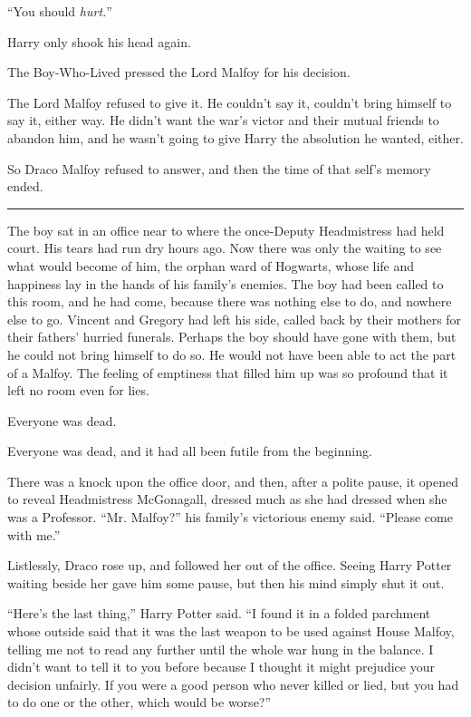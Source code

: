 ``You should \emph{hurt.}''

Harry only shook his head again.

The Boy-Who-Lived pressed the Lord Malfoy for his decision.

The Lord Malfoy refused to give it. He couldn't say it, couldn't bring himself to say it, either way. He didn't want the war's victor and their mutual friends to abandon him, and he wasn't going to give Harry the absolution he wanted, either.

So Draco Malfoy refused to answer, and then the time of that self's memory ended.

\begin{center}\rule{3in}{0.4pt}\end{center}

The boy sat in an office near to where the once-Deputy Headmistress had held court. His tears had run dry hours ago. Now there was only the waiting to see what would become of him, the orphan ward of Hogwarts, whose life and happiness lay in the hands of his family's enemies. The boy had been called to this room, and he had come, because there was nothing else to do, and nowhere else to go. Vincent and Gregory had left his side, called back by their mothers for their fathers' hurried funerals. Perhaps the boy should have gone with them, but he could not bring himself to do so. He would not have been able to act the part of a Malfoy. The feeling of emptiness that filled him up was so profound that it left no room even for lies.

Everyone was dead.

Everyone was dead, and it had all been futile from the beginning.

There was a knock upon the office door, and then, after a polite pause, it opened to reveal Headmistress McGonagall, dressed much as she had dressed when she was a Professor. ``Mr. Malfoy?'' his family's victorious enemy said. ``Please come with me.''

Listlessly, Draco rose up, and followed her out of the office. Seeing Harry Potter waiting beside her gave him some pause, but then his mind simply shut it out.

``Here's the last thing,'' Harry Potter said. ``I found it in a folded parchment whose outside said that it was the last weapon to be used against House Malfoy, telling me not to read any further until the whole war hung in the balance. I didn't want to tell it to you before because I thought it might prejudice your decision unfairly. If you were a good person who never killed or lied, but you had to do one or the other, which would be worse?''


